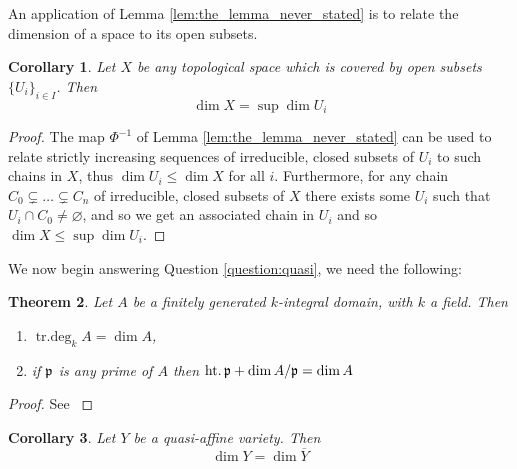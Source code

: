 \documentclass[12pt]{article}
\theoremstyle{plain}
\newtheorem{thm}{Theorem}[subsection] %
\newtheorem{cor}[thm]{Corollary}
\theoremstyle{definition}
\begin{document}
An application of Lemma \ref{lem:the_lemma_never_stated} is to relate the dimension of a space to its open subsets.
\begin{cor}
Let $X$ be any topological space which is covered by open subsets $\lbrace U_i\rbrace_{i \in I}$. Then
\begin{equation}
    \operatorname{dim}X = \operatorname{sup}\operatorname{dim}U_i
\end{equation}
\end{cor}
\begin{proof}
The map $\Phi^{-1}$ of Lemma \ref{lem:the_lemma_never_stated} can be used to relate strictly increasing sequences of irreducible, closed subsets of $U_i$ to such chains in $X$, thus $\operatorname{dim}U_i \leq \operatorname{dim}X$ for all $i$. Furthermore, for any chain $C_0 \subsetneq \hdots \subsetneq C_n$ of irreducible, closed subsets of $X$ there exists some $U_i$ such that $U_i \cap C_0 \neq \varnothing$, and so we get an associated chain in $U_i$ and so $\operatorname{dim}X \leq \operatorname{sup}\operatorname{dim}U_i$.
\end{proof}
We now begin answering Question \ref{question:quasi}, we need the following:
\begin{thm}
\label{thm:onepointeight}
Let $A$ be a finitely generated $k$-integral domain, with $k$ a field. Then
\begin{enumerate}
    \item\label{thm:onepointeighta} $\operatorname{tr.deg}_kA = \operatorname{dim}A$,
    \item\label{thm:onepointeightb} if $\frak{p}$ is any prime of $A$ then $\operatorname{ht.}\frak{p} + \operatorname{dim}A/\frak{p} = \operatorname{dim}A$
\end{enumerate}
\end{thm}
\begin{proof}
See \cite{algebra}
\end{proof}
\begin{cor}\label{lem:quasi_dimension}
Let $Y$ be a quasi-affine variety. Then
\begin{equation}
    \operatorname{dim}Y = \operatorname{dim}\overline{Y}
\end{equation}
\end{cor}
\end{document}
